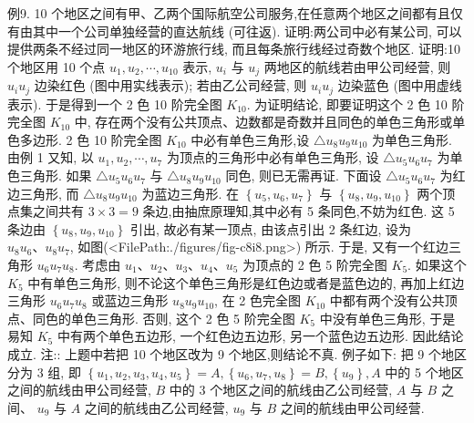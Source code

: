 例9. 10 个地区之间有甲、乙两个国际航空公司服务,在任意两个地区之间都有且仅有由其中一个公司单独经营的直达航线 (可往返). 证明:两公司中必有某公司, 可以提供两条不经过同一地区的环游旅行线, 而且每条旅行线经过奇数个地区.
证明:10 个地区用 10 个点 $u_1, u_2, \cdots, u_{10}$ 表示, $u_i$ 与 $u_j$ 两地区的航线若由甲公司经营, 则 $u_i u_j$ 边染红色 (图中用实线表示); 若由乙公司经营, 则 $u_i u_j$ 边染蓝色 (图中用虚线表示). 于是得到一个 2 色 10 阶完全图 $K_{10}$. 为证明结论, 即要证明这个 2 色 10 阶完全图 $K_{10}$ 中, 存在两个没有公共顶点、边数都是奇数并且同色的单色三角形或单色多边形.
2 色 10 阶完全图 $K_{10}$ 中必有单色三角形,设 $\triangle u_8 u_9 u_{10}$ 为单色三角形.
由例 1 又知, 以 $u_1, u_2, \cdots, u_7$ 为顶点的三角形中必有单色三角形, 设 $\triangle u_5 u_6 u_7$ 为单色三角形.
如果 $\triangle u_5 u_6 u_7$ 与 $\triangle u_8 u_9 u_{10}$ 同色, 则已无需再证.
下面设 $\triangle u_5 u_6 u_7$ 为红边三角形, 而 $\triangle u_8 u_9 u_{10}$ 为蓝边三角形.
在 $\left\{u_5, u_6, u_7\right\}$ 与 $\left\{u_8, u_9, u_{10}\right\}$ 两个顶点集之间共有 $3 \times 3=9$ 条边,由抽庶原理知,其中必有 5 条同色,不妨为红色.
这 5 条边由 $\left\{u_8, u_9, u_{10}\right\}$ 引出, 故必有某一顶点, 由该点引出 2 条红边, 设为 $u_8 u_6 、 u_8 u_7$, 如图(<FilePath:./figures/fig-c8i8.png>) 所示.
于是, 又有一个红边三角形 $u_6 u_7 u_8$.
考虑由 $u_1 、 u_2 、 u_3 、 u_4 、 u_5$ 为顶点的 2 色 5 阶完全图 $K_5$. 如果这个 $K_5$ 中有单色三角形, 则不论这个单色三角形是红色边或者是蓝色边的, 再加上红边三角形 $u_6 u_7 u_8$ 或蓝边三角形 $u_8 u_9 u_{10}$, 在 2 色完全图 $K_{10}$ 中都有两个没有公共顶点、同色的单色三角形.
否则, 这个 2 色 5 阶完全图 $K_5$ 中没有单色三角形, 于是易知 $K_5$ 中有两个单色五边形, 一个红色边五边形, 另一个蓝色边五边形.
因此结论成立.
注:: 上题中若把 10 个地区改为 9 个地区,则结论不真.
例子如下: 把 9 个地区分为 3 组, 即 $\left\{u_1, u_2, u_3, u_4, u_5\right\}=A,\left\{u_6, u_7, u_8\right\}=B,\left\{u_9\right\}, A$ 中的 5 个地区之间的航线由甲公司经营, $B$ 中的 3 个地区之间的航线由乙公司经营, $A$ 与 $B$ 之间、 $u_9$ 与 $A$ 之间的航线由乙公司经营, $u_9$ 与 $B$ 之间的航线由甲公司经营.


